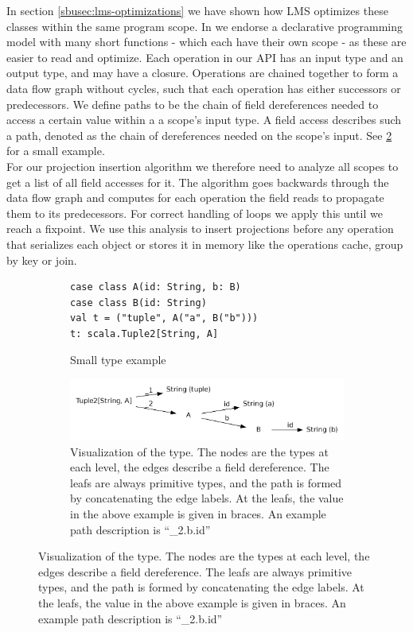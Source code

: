 In section \ref{sbusec:lms-optimizations} we have shown how LMS optimizes these classes within the same program scope. In \tool we endorse a declarative programming model with many short functions - which each have their own scope - as these are easier to read and optimize. Each operation in our API has an input type and an output type, and may have a closure. Operations are chained together to form a data flow graph without cycles, such that each operation has either successors or predecessors. We define paths to be the chain of field dereferences needed to access a certain value within a a scope's input type. A field access describes such a path, denoted as the chain of dereferences needed on the scope's input. See \ref{fig:type_tree} for a small example. \\
For our projection insertion algorithm we therefore need to analyze all scopes to get a list of all field accesses for it. The algorithm goes backwards through the data flow graph and computes for each operation the field reads to propagate them to its predecessors. For correct handling of loops we apply this until we reach a fixpoint. We use this analysis to insert projections before any operation that serializes each object or stores it in memory like the operations cache, group by key or join.
\begin{figure}
\begin{subfigure}[b]{.5\linewidth}
\begin{lstlisting}[name=code, caption=Types for field access example]
case class A(id: String, b: B)
case class B(id: String)  
val t = ("tuple", A("a", B("b"))) 
t: scala.Tuple2[String, A]
\end{lstlisting}
\caption{Small type example}
\end{subfigure}
\begin{subfigure}[b]{.5\linewidth}
\centering
\includegraphics[width=\linewidth]{dot/access.png}
\caption{Visualization of the type. The nodes are the types at each level, the edges describe a field dereference. The leafs are always primitive types, and the path is formed by concatenating the edge labels. At the leafs, the value in the above example is given in braces. An example path description is ``\_2.b.id''}
\label{fig:type_tree}
\end{subfigure}
\end{figure}
